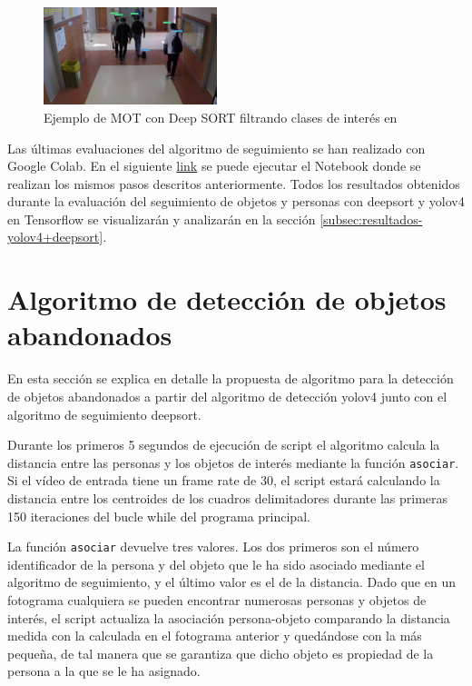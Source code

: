 \begin{figure}[ht]
\centering
\includegraphics[width=0.45\textwidth]{img/chapters/desarrollo/prueba2-deepsort-frame439.jpg}
\caption{\label{fig:prueba2-deepsort-frame439}Ejemplo de MOT con Deep SORT filtrando clases de interés en \cite{gba-dataset}}
\end{figure}

Las últimas evaluaciones del algoritmo de seguimiento se han realizado con Google Colab. En el siguiente \href{https://colab.research.google.com/drive/18vL9LH8e9VaimA9LzBD35Cn4AOm6C17I?usp=sharing}{link} se puede ejecutar el Notebook donde se realizan los mismos pasos descritos anteriormente. Todos los resultados obtenidos durante la evaluación del seguimiento de objetos y personas con \gls{deepsort} y \gls{yolov4} en Tensorflow se visualizarán y analizarán en la sección \ref{subsec:resultados-yolov4+deepsort}.

\section{Algoritmo de detección de objetos abandonados}
\label{sec:algoritmo-object-detection}

En esta sección se explica en detalle la propuesta de algoritmo para la detección de objetos abandonados a partir del algoritmo de detección \gls{yolov4} junto con el algoritmo de seguimiento \gls{deepsort}.

Durante los primeros 5 segundos de ejecución de script el algoritmo calcula la distancia entre las personas y los objetos de interés mediante la función \texttt{asociar}. Si el vídeo de entrada tiene un frame rate de 30, el script estará calculando la distancia entre los centroides de los cuadros delimitadores durante las primeras 150 iteraciones del bucle while del programa principal.

La función \texttt{asociar} devuelve tres valores. Los dos primeros son el número identificador de la persona y del objeto que le ha sido asociado mediante el algoritmo de seguimiento, y el último valor es el de la distancia. Dado que en un fotograma cualquiera se pueden encontrar numerosas personas y objetos de interés, el script actualiza la asociación persona-objeto comparando la distancia medida con la calculada en el fotograma anterior y quedándose con la más pequeña, de tal manera que se garantiza que dicho objeto es propiedad de la persona a la que se le ha asignado.


